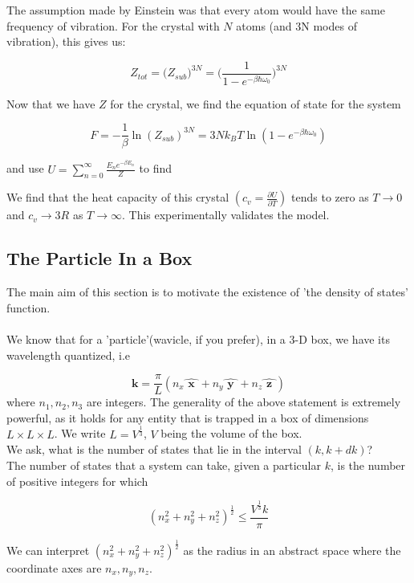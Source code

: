 \documentclass[oneside]{book}
\begin{document}
The assumption made by Einstein was that every atom would have the same frequency of vibration. For the crystal with $N$ atoms (and 3N modes of vibration), this gives us:

\[Z_{tot} = \Big(Z_{sub}\Big)^{3N} = \Big(\frac{1}{1 - e^{-\beta\hbar\omega_0}}\Big)^{3N}\]

Now that we have $Z$ for the crystal, we find the equation of state for the system

\[ F =  -\frac{1}{\beta} \ln{(Z_{sub})^{3N}} = 3Nk_BT\ln{(1 - e^{-\beta\hbar\omega_0 })} \]

and use $U = \sum_{n =0}^{\infty}\frac{E_ne^{-\beta E_n}}{Z}$ to find 

\begin{center}
\end{center}

We find that the heat capacity of this crystal $(c_v = \frac{\partial U}{\partial T})$ tends to zero as $T\rightarrow 0$ and $c_v\rightarrow 3R$ as $T\rightarrow \infty$. This experimentally validates the model.


\subsection{The Particle In a Box}
The main aim of this section is to motivate the existence of 'the density of states' function.\\ \\
We know that for a 'particle'(wavicle, if you prefer), in a 3-D box, we have its wavelength quantized, i.e

\[ \textbf{k} = \frac{\pi}{L}(n_x \hat{\textbf{ x }} + n_y\hat{\textbf{ y }}  + n_z \hat{\textbf{ z }}  ) \]
where $n_1,n_2,n_3$ are integers. The generality of the above statement is extremely powerful, as it holds for any entity that is trapped in a box of dimensions $L \times L \times L $. We write $L = V^{\frac{1}{3}}$, $V$ being the volume of the box.\\

We ask, what is the number of states that lie in the interval $(k, k + dk)$? \\

The number of states that a system can take, given a particular $k$, is the number of positive integers for which

\[ (n_x^2 + n_y^2 +n_z^2 )^\frac{1}{2} \leq \frac{V^{\frac{1}{3}} k }{\pi}\]

We can interpret $(n_x^2 + n_y^2 +n_z^2 )^\frac{1}{2} $ as the radius in an abstract space where the coordinate axes are $n_x,n_y,n_z$. \\
\end{document}
